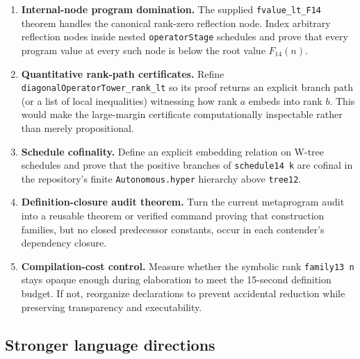 \documentclass[11pt]{article}
\theoremstyle{definition}
\theoremstyle{remark}
\newcommand{\lean}[1]{\texttt{#1}}
\begin{document}
\begin{enumerate}[leftmargin=*]
\item \textbf{Internal-node program domination.}  The supplied
  \lean{fvalue\_lt\_F14} theorem handles the canonical rank-zero reflection
  node.  Index arbitrary reflection nodes inside nested \lean{operatorStage}
  schedules and prove that every program value at every such node is below the
  root value $F_{14}(n)$.

\item \textbf{Quantitative rank-path certificates.}  Refine
  \lean{diagonalOperatorTower\_rank\_lt} so its proof returns an explicit
  branch path (or a list of local inequalities) witnessing how rank $a$ embeds
  into rank $b$.  This would make the large-margin certificate computationally
  inspectable rather than merely propositional.

\item \textbf{Schedule cofinality.}  Define an explicit embedding relation on
  W-tree schedules and prove that the positive branches of \lean{schedule14 k}
  are cofinal in the repository's finite \lean{Autonomous.hyper} hierarchy
  above \lean{tree12}.

\item \textbf{Definition-closure audit theorem.}  Turn the current metaprogram
  audit into a reusable theorem or verified command proving that construction
  families, but no closed predecessor constants, occur in each contender's
  dependency closure.

\item \textbf{Compilation-cost control.}  Measure whether the symbolic rank
  \lean{family13 n} stays opaque enough during elaboration to meet the 15-second
  definition budget.  If not, reorganize declarations to prevent accidental
  reduction while preserving transparency and executability.
\end{enumerate}

\subsection{Stronger language directions}
\end{document}
